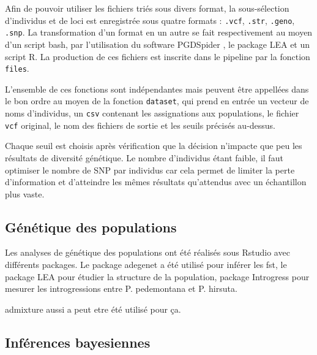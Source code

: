 Afin de pouvoir utiliser les fichiers triés sous divers format, la sous-sélection d'individus et de loci est enregistrée sous quatre formats : \verb|.vcf|, \verb|.str|, \verb|.geno|, \verb|.snp|. 
La transformation d'un format en un autre se fait respectivement au moyen d'un script bash, par l'utilisation du software PGDSpider \citep{Lischer2012}, le package LEA \citep{Frichot2015} et un script R. 
La production de ces fichiers est inscrite dans le pipeline par la fonction \verb|files|.

L'ensemble de ces fonctions sont indépendantes mais peuvent être appellées dans le bon ordre au moyen de la fonction \verb|dataset|, qui prend en entrée un vecteur de noms d'individus, un \verb|csv| contenant les assignations aux populations, le fichier \verb|vcf| original, le nom des fichiers de sortie et les seuils précisés au-dessus.


Chaque seuil est choisis après vérification que la décision n'impacte que peu les résultats de diversité génétique.
Le nombre d'individus étant faible, il faut optimiser le nombre de SNP par individus car cela permet de limiter la perte d'information et d'atteindre les mêmes résultats qu'attendus avec un échantillon plus vaste. \citep{Nazareno2017}


\subsection{Génétique des populations}

Les analyses de génétique des populations ont été réalisés sous Rstudio \citep{RTeam2017} avec différents packages. 
Le package adegenet a été utilisé pour inférer les fst, le package LEA pour étudier la structure de la population, package Introgress pour mesurer les introgressions entre P. pedemontana et P. hirsuta.

admixture aussi a peut etre été utilisé pour ça.

\subsection{Inférences bayesiennes}

